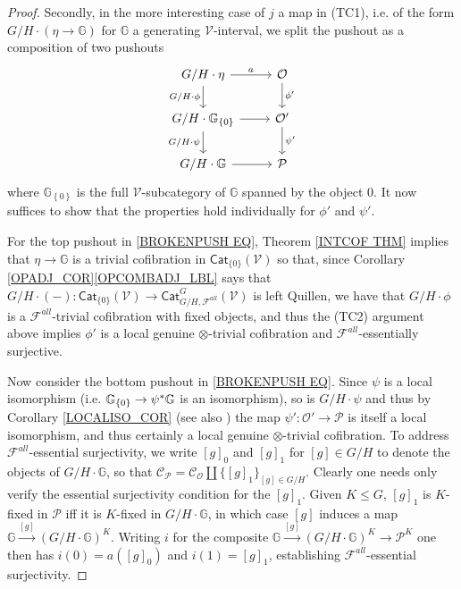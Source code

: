 \documentclass[a4paper,10pt
,draft
]{article}%
\numberwithin{equation}{section}
\numberwithin{figure}{section}
\theoremstyle{definition} %
\newcommand{\set}[1]{\left\{#1\right\}}%
\newcommand{\F}{\ensuremath{\mathcal F}}
\newcommand{\V}{\ensuremath{\mathcal V}}
\renewcommand{\O}{\ensuremath{\mathcal O}}
\renewcommand{\P}{\ensuremath{\mathcal P}}
\newcommand{\C}{\ensuremath{\mathcal C}}
\newcommand{\1}{\ensuremath{\mathbbm 1}}%
\begin{document}
\begin{proof}
     
	Secondly, in the more interesting case of $j$ a map in (TC1), 
	i.e. of the form $G/H \cdot (\eta \to \mathbb{G})$ for $\mathbb{G}$ a generating $\V$-interval,
	we split the pushout as a composition of two pushouts 
\begin{equation}\label{BROKENPUSH EQ}
\begin{tikzcd}
	G/H \cdot \eta \arrow[r, "a"] \arrow[d, "G/H \cdot \phi"']
&
	\O \arrow[d,"\phi'"]
\\
	G/H \cdot \mathbb{G}_{\set{0}} \arrow[r] \arrow[d, "G/H \cdot \psi"']
&
	\O' \arrow[d,"\psi'"]
\\
	G/H \cdot \mathbb{G} \arrow[r]
&
	\P
\end{tikzcd}
\end{equation}
      where $\mathbb{G}_{\set{0}}$ is the full $\V$-subcategory of $\mathbb{G}$ spanned by the object $0$.
      It now suffices to show that the properties hold individually for $\phi'$ and $\psi'$.
 
      
      For the top pushout in \eqref{BROKENPUSH EQ}, Theorem \ref{INTCOF THM} implies that $\eta \to \mathbb{G}$
      is a trivial cofibration in $\mathsf{Cat}_{\{0\}}(\V)$
      so that, since Corollary \ref{OPADJ_COR}\ref{OPCOMBADJ_LBL} %
      says that $G/H \cdot (-) \colon \mathsf{Cat}_{\{0\}}(\V) \to \mathsf{Cat}^G_{G/H,\F^{all}}(\V)$ is left Quillen,
      we have that $G/H \cdot \phi$ is a $\F^{all}$-trivial cofibration with fixed objects,
      and thus the (TC2) argument above implies $\phi'$ is
      a local genuine $\otimes$-trivial cofibration and
      $\F^{all}$-essentially surjective.
      
	Now consider the bottom pushout in \eqref{BROKENPUSH EQ}.
	Since $\psi$ is a local isomorphism (i.e. $\mathbb{G}_{\{0\}} \to \psi^{\**}\mathbb{G}$ is an isomorphism),
	so is $G/H \cdot \psi$ and thus by Corollary \ref{LOCALISO_COR} (see also \cite[Prop. B.22]{Cav})
	the map $\psi' \colon \O' \to \mathcal{P}$
	is itself a local isomorphism, and thus certainly a local genuine $\otimes$-trivial cofibration.
% 
	To address $\F^{all}$-essential surjectivity, 
	we write $[g]_0$ and $[g]_1$ for $[g] \in G/H$
	to denote the objects of $G/H \cdot \mathbb{G}$,
	so that $\C_{\P} = \C_{\O} \amalg \{[g]_1\}_{[g] \in G/H}$.
	Clearly one needs only verify the essential surjectivity condition for the $[g]_1$.
	Given $K \leq G$,
	$[g]_1$ is $K$-fixed in $\P$ iff it is $K$-fixed in $G/H \cdot \mathbb{G}$,
	in which case $[g]$ induces a map
	$\mathbb{G} \xrightarrow{[g]} \left(G/H \cdot \mathbb{G}\right)^K$.
	Writing $i$ for the composite 
	$\mathbb{G} \xrightarrow{[g]} \left(G/H \cdot \mathbb{G}\right)^K \to \P^K$
	one then has $i(0) = a([g]_0)$ and $i(1)=[g]_1$,
	establishing $\F^{all}$-essential surjectivity.
\end{proof}
\end{document}
